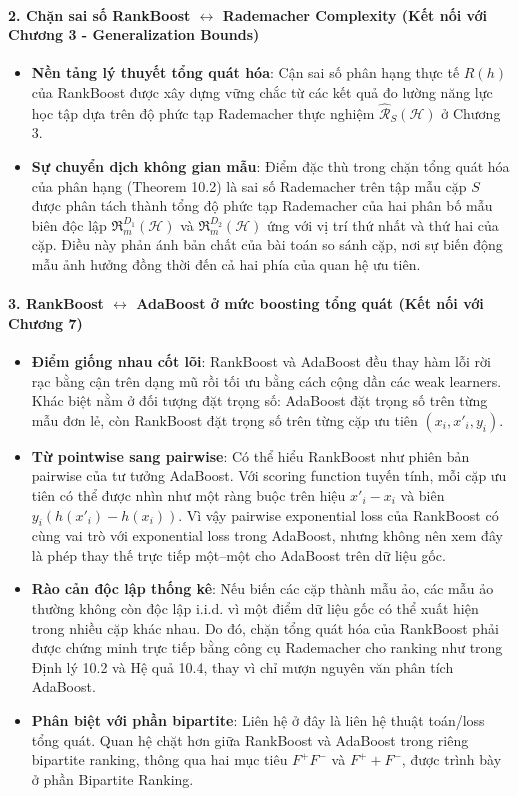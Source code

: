 \paragraph{2. Chặn sai số RankBoost $\leftrightarrow$ Rademacher Complexity (Kết nối với Chương 3 - Generalization Bounds)}
\begin{itemize}
    \item \textbf{Nền tảng lý thuyết tổng quát hóa}: Cận sai số phân hạng thực tế $R(h)$ của RankBoost được xây dựng vững chắc từ các kết quả đo lường năng lực học tập dựa trên độ phức tạp Rademacher thực nghiệm $\widehat{\mathcal{R}}_S(\mathcal{H})$ ở Chương 3.
    \item \textbf{Sự chuyển dịch không gian mẫu}: Điểm đặc thù trong chặn tổng quát hóa của phân hạng (Theorem 10.2) là sai số Rademacher trên tập mẫu cặp $S$ được phân tách thành tổng độ phức tạp Rademacher của hai phân bố mẫu biên độc lập $\mathfrak{R}_m^{D_1}(\mathcal{H})$ và $\mathfrak{R}_m^{D_2}(\mathcal{H})$ ứng với vị trí thứ nhất và thứ hai của cặp. Điều này phản ánh bản chất của bài toán so sánh cặp, nơi sự biến động mẫu ảnh hưởng đồng thời đến cả hai phía của quan hệ ưu tiên.
\end{itemize}

\paragraph{3. RankBoost $\leftrightarrow$ AdaBoost ở mức boosting tổng quát (Kết nối với Chương 7)}
\begin{itemize}
    \item \textbf{Điểm giống nhau cốt lõi}: RankBoost và AdaBoost đều thay hàm lỗi rời rạc bằng cận trên dạng mũ rồi tối ưu bằng cách cộng dần các weak learners. Khác biệt nằm ở đối tượng đặt trọng số: AdaBoost đặt trọng số trên từng mẫu đơn lẻ, còn RankBoost đặt trọng số trên từng cặp ưu tiên $(x_i,x'_i,y_i)$.
    \item \textbf{Từ pointwise sang pairwise}: Có thể hiểu RankBoost như phiên bản pairwise của tư tưởng AdaBoost. Với scoring function tuyến tính, mỗi cặp ưu tiên có thể được nhìn như một ràng buộc trên hiệu $x'_i-x_i$ và biên $y_i(h(x'_i)-h(x_i))$. Vì vậy pairwise exponential loss của RankBoost có cùng vai trò với exponential loss trong AdaBoost, nhưng không nên xem đây là phép thay thế trực tiếp một--một cho AdaBoost trên dữ liệu gốc.
    \item \textbf{Rào cản độc lập thống kê}: Nếu biến các cặp thành mẫu ảo, các mẫu ảo thường không còn độc lập i.i.d. vì một điểm dữ liệu gốc có thể xuất hiện trong nhiều cặp khác nhau. Do đó, chặn tổng quát hóa của RankBoost phải được chứng minh trực tiếp bằng công cụ Rademacher cho ranking như trong Định lý 10.2 và Hệ quả 10.4, thay vì chỉ mượn nguyên văn phân tích AdaBoost.
    \item \textbf{Phân biệt với phần bipartite}: Liên hệ ở đây là liên hệ thuật toán/loss tổng quát. Quan hệ chặt hơn giữa RankBoost và AdaBoost trong riêng bipartite ranking, thông qua hai mục tiêu $F^+F^-$ và $F^+ + F^-$, được trình bày ở phần Bipartite Ranking.
\end{itemize}

